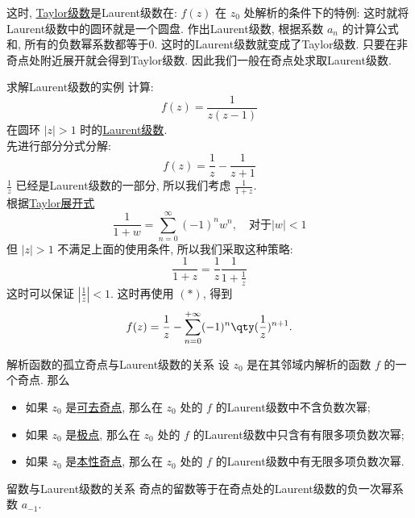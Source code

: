 \documentclass[UTF8]{ctexart}
\begin{document}
        这时, \hyperref[thm:TaylorSeries]{Taylor级数}是Laurent级数在:  \(f(z)\) 在 \(z_0\) 处解析的条件下的特例: 这时就将Laurent级数中的圆环就是一个圆盘. 作出Laurent级数, 根据系数 \(a_n\) 的计算公式和\CauchyThm, 所有的负数幂系数都等于0. 这时的Laurent级数就变成了Taylor级数. 只要在非奇点处附近展开就会得到Taylor级数. 因此我们一般在奇点处求取Laurent级数. 

        \begin{xmp}
            {求解Laurent级数的实例}
            计算: 
            \[f(z)=\frac{1}{z(z-1)}\]
            在圆环 \(|z|>1\) 时的\hyperref[thm:Laurent]{Laurent级数}.\\
            先进行部分分式分解: 
            \[f(z)=\frac{1}{z}-\frac{1}{z+1}\]
            \(\frac{1}{z}\) 已经是Laurent级数的一部分, 所以我们考虑 \(\frac{1}{1+z}\).\\
            根据\hyperref[xmp:TaylorCommon]{Taylor展开式}
            \[\frac{1}{1 + w} = \sum_{n=0}^{\infty} (-1)^n w^n, \quad \text{对于} |w| < 1\tag{ \(\ast\) }\]
            但 \(|z|>1\) 不满足上面的使用条件, 所以我们采取这种策略: 
            \[\frac{1}{1+z}=\frac{1}{z}\frac{1}{1+\frac{1}{z}}\]
            这时可以保证 \(\left\lvert \frac{1}{z}\right\rvert <1\). 这时再使用 \((\ast)\), 得到
            \[f(z)=\frac{1}{z}-\sum_{n=0}^{+\infty}(-1)^n\qty(\frac{1}{z})^{n+1}.\]
        \end{xmp}

        \begin{thm}
            {解析函数的孤立奇点与Laurent级数的关系}
            设 \(z_0\) 是在其邻域内解析的函数 \(f\) 的一个奇点. 那么
            \begin{itemize}
                \item 如果 \(z_0\) 是\hyperref[dfn:RemovableSingularity]{可去奇点}, 那么在 \(z_0\) 处的 \(f\) 的Laurent级数中不含负数次幂; 
                \item 如果 \(z_0\) 是\hyperref[dfn:PolarSingularity]{极点}, 那么在 \(z_0\) 处的 \(f\) 的Laurent级数中只含有有限多项负数次幂; 
                \item 如果 \(z_0\) 是\hyperref[dfn:EssentialSingularity]{本性奇点}, 那么在 \(z_0\) 处的 \(f\) 的Laurent级数中有无限多项负数次幂. 
            \end{itemize}
        \end{thm}

        \begin{crl}
            {留数与Laurent级数的关系}
            奇点的留数等于在奇点处的Laurent级数的负一次幂系数 \(a_{-1}\).
        \end{crl}
\end{document}
